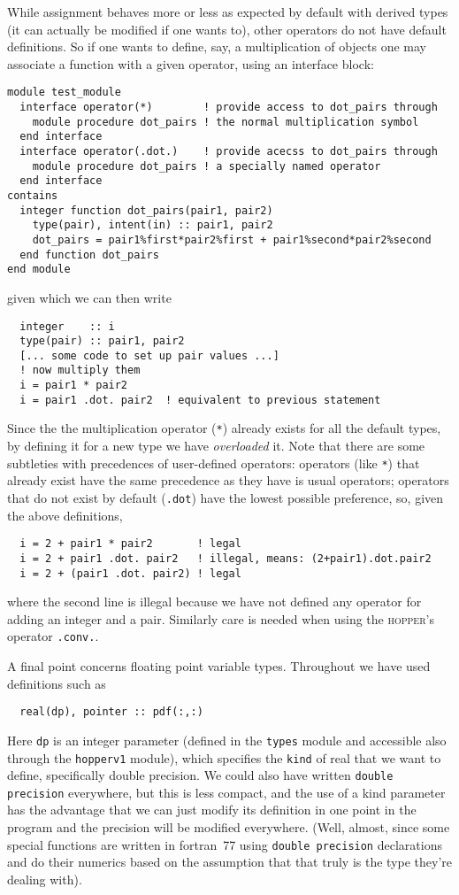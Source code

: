 \documentclass[12pt]{article}
\newcommand{\hopper}{\textsc{hopper}\xspace}
\begin{document}
While assignment behaves more or less as expected by default with
derived types (it can actually be modified if one wants to), other
operators do not have default definitions. So if one wants to define,
say, a multiplication of objects one may associate a function with a
given operator, using an interface block:
\begin{verbatim}
module test_module
  interface operator(*)        ! provide access to dot_pairs through 
    module procedure dot_pairs ! the normal multiplication symbol
  end interface 
  interface operator(.dot.)    ! provide acecss to dot_pairs through
    module procedure dot_pairs ! a specially named operator
  end interface 
contains
  integer function dot_pairs(pair1, pair2)
    type(pair), intent(in) :: pair1, pair2
    dot_pairs = pair1%first*pair2%first + pair1%second*pair2%second
  end function dot_pairs
end module
\end{verbatim}
given which we can then write
\begin{verbatim}
  integer    :: i
  type(pair) :: pair1, pair2
  [... some code to set up pair values ...]
  ! now multiply them
  i = pair1 * pair2
  i = pair1 .dot. pair2  ! equivalent to previous statement
\end{verbatim}
Since the the multiplication operator (\texttt{*}) already exists for
all the default types, by defining it for a new type we have
\emph{overloaded} it. Note that there are some subtleties with
precedences of user-defined operators: operators (like \texttt{*})
that already exist have the same precedence as they have is usual
operators; operators that do not exist by default (\texttt{.dot}) have
the lowest possible preference, so, given the above definitions,
\begin{verbatim}
  i = 2 + pair1 * pair2       ! legal
  i = 2 + pair1 .dot. pair2   ! illegal, means: (2+pair1).dot.pair2
  i = 2 + (pair1 .dot. pair2) ! legal
\end{verbatim}
where the second line is illegal because we have not defined any
operator for adding an integer and a pair. Similarly care is needed
when using the \hopper's operator \texttt{.conv.}.

A final point concerns floating point variable types. Throughout we
have used definitions such as
\begin{verbatim}
  real(dp), pointer :: pdf(:,:)
\end{verbatim}
Here \texttt{dp} is an integer parameter (defined in the
\texttt{types} module and accessible also through the
\texttt{hopperv1} module), which specifies the \texttt{kind} of real
that we want to define, specifically double precision. We could also
have written \texttt{double precision} everywhere, but this is less
compact, and the use of a kind parameter has the advantage that we
can just modify its definition in one point in the program and the
precision will be modified everywhere. (Well, almost, since some
special functions are written in fortran~77 using \texttt{double
  precision} declarations and do their numerics based on the
assumption that that truly is the type they're dealing with).
\end{document}
